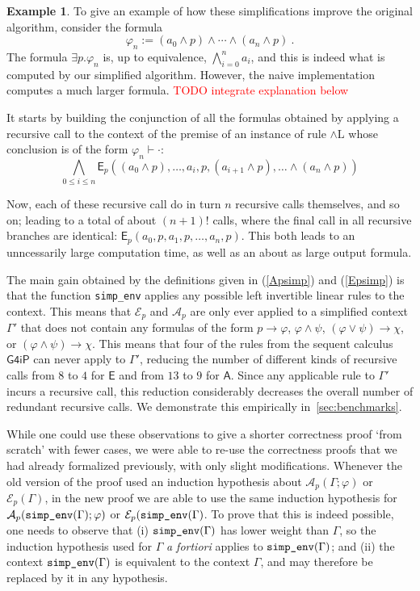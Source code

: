 \documentclass[english,review]{jflart}
\theoremstyle{definition}
\newtheorem{example}[definition]{Example}
\theoremstyle{plain}
\newcommand{\simpenv}[1]{\mbox{\texttt{simp\_env}}(#1)}
\newcommand{\Ep}[1]{\mathsf{E}_{p}(#1)}
\renewcommand{\phi}{\varphi}
\newcommand{\Gfourip}{\mathsf{G4iP}}
\newcommand{\sam}[1]{\textcolor{red}{#1}}
\begin{document}
\begin{example}
	To give an example of how these simplifications improve the original algorithm, consider the formula %
%
$$
	\phi_n := {(a_0 \wedge p) \wedge \cdots \wedge(a_n \wedge p)}\ .
$$
The formula $\exists p. \phi_n$ is, up to equivalence, $\bigwedge_{i=0}^n a_i$, and this is indeed what is computed by our simplified algorithm. However, the naive implementation computes a much larger formula. \sam{TODO integrate explanation below}

It starts by building the conjunction of all the formulas obtained by applying a recursive call
to the context of the premise of an instance of rule ${\wedge \mathrm L}$ whose conclusion is of the form $\phi_n \vdash \cdot$:
$$\bigwedge_{0\le i\le n} \Ep{(a_0 \wedge p), \dots, a_i, p , (a_{i+1} \wedge p), \dots \wedge (a_n \wedge p)}$$

Now, each of these recursive call do in turn $n$ recursive calls themselves, and so on; leading to a total of about $(n+1)!$ calls,
where the final call in all recursive branches are identical: $\Ep{a_0, p, a_1, p, \dots, a_n, p}$.
This both leads to an unncessarily large computation time, as well as an about as large output formula.
\end{example}
The main gain obtained by the definitions given in (\ref{Apsimp}) and (\ref{Epsimp}) is that the function \texttt{simp\_env} applies any possible left invertible linear rules to the context. This means that $\mathcal{E}_p$ and $\mathcal{A}_p$ are only ever applied to a simplified context $\Gamma'$ that does not contain any formulas of the form $p \to \phi$, $\phi \wedge \psi$, $(\phi \vee \psi) \to \chi$, or $(\phi \wedge \psi) \to \chi$. This means that four of the rules from the sequent calculus $\Gfourip$ can never apply to $\Gamma'$, reducing the number of different kinds of recursive calls from $8$ to $4$ for $\mathsf{E}$ and from $13$ to $9$ for $\mathsf{A}$. Since any applicable rule to $\Gamma'$ incurs a recursive call, this reduction considerably decreases the overall number of redundant recursive calls. We demonstrate this empirically in~\cref{sec:benchmarks}.

While one could use these observations to give a shorter correctness proof `from scratch' with fewer cases, we were able to re-use the correctness proofs that we had already formalized previously, with only slight modifications. Whenever the old version of the proof used an induction hypothesis about $\mathcal{A}_p(\Gamma; \phi)$ or $\mathcal{E}_p(\Gamma)$, in the new proof we are able to use the same induction hypothesis for $\mathcal{A}_p(\simpenv{\Gamma}; \phi)$ or $\mathcal{E}_p(\simpenv{\Gamma}$. To prove that this is indeed possible, one needs to observe that (i) $\simpenv{\Gamma}$ has lower weight than $\Gamma$, so the induction hypothesis used for $\Gamma$ \emph{a fortiori}  applies to $\simpenv{\Gamma}$; and (ii) the context $\simpenv{\Gamma}$ is equivalent to the context $\Gamma$, and may therefore be replaced by it in any hypothesis.
\end{document}
